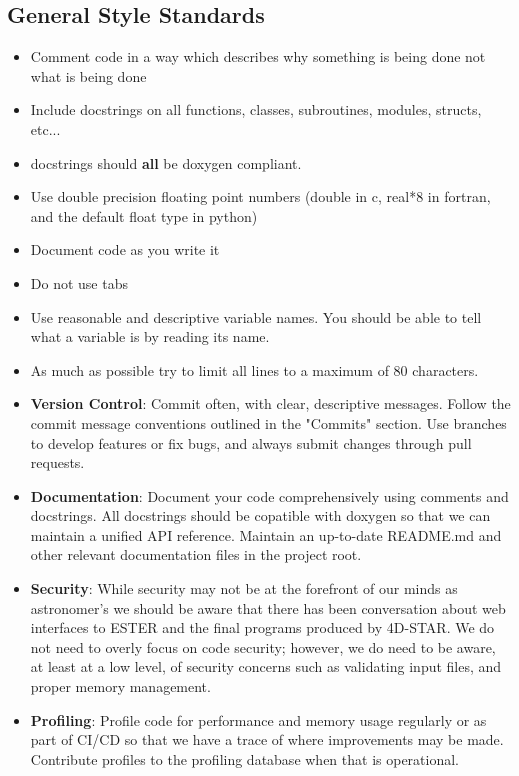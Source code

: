\documentclass{ol-softwaremanual}
\begin{document}
\subsection{General Style Standards}
\begin{itemize}
    \item Comment code in a way which describes why something is being done not what is being done
    \item Include docstrings on all functions, classes, subroutines, modules, structs, etc...
    \item docstrings should \textbf{all} be doxygen compliant.
    \item Use double precision floating point numbers (double in c, real*8 in fortran, and the default float type in python)
    \item Document code as you write it
    \item Do not use tabs
    \item Use reasonable and descriptive variable names. You should be able to tell what a variable is by reading its name.
    \item As much as possible try to limit all lines to a maximum of 80 characters.
    \item \textbf{Version Control}:
        Commit often, with clear, descriptive messages. Follow the commit message conventions outlined in the "Commits" section.
        Use branches to develop features or fix bugs, and always submit changes through pull requests.

    \item \textbf{Documentation}:
        Document your code comprehensively using comments and docstrings. All docstrings should be copatible with doxygen so that we can maintain a unified API reference. Maintain an up-to-date README.md and other relevant documentation files in the project root.

    \item \textbf{Security}:
        While security may not be at the forefront of our minds as astronomer's we should be aware that there has been conversation about web interfaces to ESTER and the final programs produced by 4D-STAR. We do not need to overly focus on code security; however, we do need to be aware, at least at a low level, of security concerns such as validating input files, and proper memory management.

    \item \textbf{Profiling}:
        Profile code for performance and memory usage regularly or as part of CI/CD so that we have a trace of where improvements may be made. Contribute profiles to the profiling database when that is operational.
\end{itemize}
\end{document}
